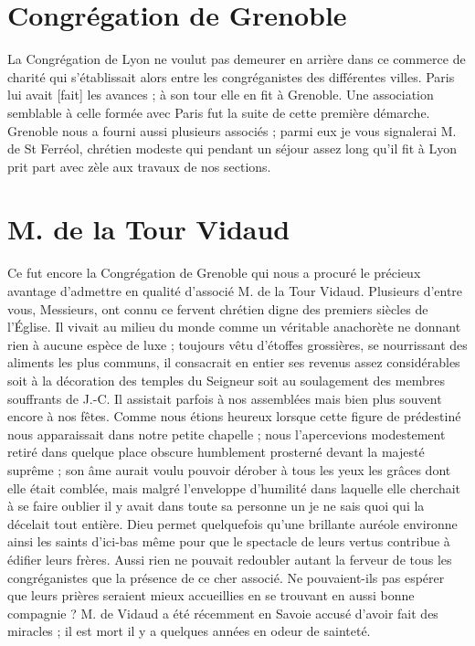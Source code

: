 \section*{Congrégation de Grenoble}
La Congrégation de Lyon ne voulut pas demeurer en arrière dans ce commerce de charité qui s'établissait alors entre les congréganistes des différentes villes. Paris lui avait [fait] les avances ; à son tour elle en fit à Grenoble. Une association semblable à celle formée avec Paris fut la suite de cette première démarche. Grenoble nous a fourni aussi plusieurs associés ; parmi eux je vous signalerai M. de St Ferréol, chrétien modeste qui pendant un séjour assez long qu'il fit à Lyon prit part avec zèle aux travaux de nos sections.

\section*{M. de la Tour Vidaud}
Ce fut encore la Congrégation de Grenoble qui nous a procuré le précieux avantage d'admettre en qualité d'associé M. de la Tour Vidaud. Plusieurs d'entre vous, Messieurs, ont connu ce fervent chrétien digne des premiers siècles de l'Église. Il vivait au milieu du monde comme un véritable anachorète ne donnant rien à aucune espèce de luxe ; toujours vêtu d'étoffes grossières, se nourrissant des aliments les plus communs, il consacrait en entier ses revenus assez considérables soit à la décoration des temples du Seigneur soit au soulagement des membres souffrants de J.-C. Il assistait parfois à nos assemblées mais bien plus souvent encore à nos fêtes. Comme nous étions heureux lorsque cette figure de prédestiné nous apparaissait dans notre petite chapelle ; nous l'apercevions modestement retiré dans quelque place obscure humblement prosterné devant la majesté suprême ; son âme aurait voulu pouvoir dérober à tous les yeux les grâces dont elle était comblée, mais malgré l'enveloppe d'humilité dans laquelle elle cherchait à se faire oublier il y avait dans
toute sa personne un je ne sais quoi qui la décelait tout entière. Dieu permet quelquefois qu'une brillante auréole environne ainsi les saints d'ici-bas même pour que le spectacle de leurs vertus contribue à édifier leurs frères. Aussi rien ne pouvait redoubler autant la ferveur de tous les congréganistes que la présence de ce cher associé. Ne pouvaient-ils pas espérer que leurs prières seraient mieux accueillies en se trouvant en aussi bonne compagnie ? M. de Vidaud a été récemment en Savoie accusé d'avoir fait des miracles ; il est mort il y a quelques années en odeur de sainteté.


